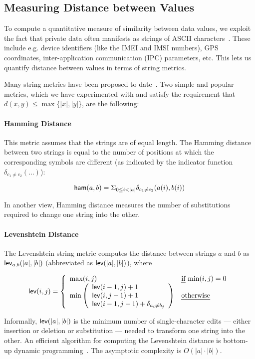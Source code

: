 \subsection{Measuring Distance between Values}\label{Se:similarstr}

To compute a quantitative measure of similarity between data values, we exploit the fact that private data often manifests as strings of ASCII characters~\cite{EGCCJMS:OSDI10,HHJSW:CCS11,YYZGNW:CCS13}. These include e.g. device identifiers (like the IMEI and IMSI numbers), GPS coordinates, inter-application communication (IPC) parameters, etc. This lets us quantify distance between values in terms of string metrics.

Many string metrics have been proposed to date~\cite{PS:BIS07}. Two simple and popular metrics, which we have experimented with and satisfy the requirement that
$d(x,y) \leq \max \{ |x|,|y| \}$, are the following:

\paragraph{Hamming Distance} This metric assumes that the strings are of equal length. The Hamming distance between two strings is equal to the number of positions at which the corresponding symbols are different (as indicated by the indicator function $\delta_{c_1 \neq c_2}(\ldots)$):
\begin{small}
$$
{\sf ham}(a,b) = \Sigma_{0 \leq i < |a|} \delta_{c_1 \neq c_2}(a(i),b(i))
$$
\end{small}
In another view, Hamming distance measures the number of substitutions required to change one string into the other.

\paragraph{Levenshtein Distance} The Levenshtein string metric computes the distance between strings $a$ and $b$ as ${\sf lev}_{a,b}(|a|,|b|)$
(abbreviated as ${\sf lev}(|a|,|b|)$), where
\begin{small}
$$
{\sf lev}(i,j) = \left\{
  \begin{array}{l l}
   \max(i,j)				& \text{\emph{if} $\min(i,j)=0$} \\
   \min \left( {\begin{array}{l}
   		{\sf lev}(i-1,j) + 1 \\
		{\sf lev}(i,j-1) + 1 \\
		{\sf lev}(i-1,j-1) + \delta_{a_i \neq b_j} \\
   	   \end{array}} \right) & \text{\emph{otherwise}}
   \end{array} \right.
$$
\end{small}
Informally, ${\sf lev}(|a|,|b|)$ is the minimum number of single-character edits --- either insertion or deletion or substitution --- needed to transform one string into the other. An efficient algorithm for computing the Levenshtein distance is bottom-up dynamic programming~\cite{WF:JACM74}. The asymptotic complexity is $O(|a| \cdot |b|)$.

